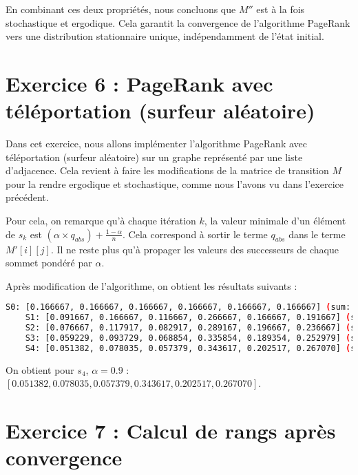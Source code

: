 En combinant ces deux propriétés, nous concluons que $M''$ est à la fois stochastique et ergodique. Cela garantit la convergence de l'algorithme PageRank vers une distribution stationnaire unique, indépendamment de l'état initial.

\section{Exercice 6 : PageRank avec téléportation (surfeur aléatoire)}

Dans cet exercice, nous allons implémenter l'algorithme PageRank avec téléportation (surfeur aléatoire) sur un graphe représenté par une liste d'adjacence. Cela revient à faire les modifications de la matrice de transition $M$ pour la rendre ergodique et stochastique, comme nous l'avons vu dans l'exercice précédent.

Pour cela, on remarque qu'à chaque itération $k$, la valeur minimale d'un élément de $s_k$ est $(\alpha \times q_{abs}) + \frac{1-\alpha}{n}$. Cela correspond à sortir le terme $q_{abs}$ dans le terme $M'[i][j]$. Il ne reste plus qu'à propager les valeurs des successeurs de chaque sommet pondéré par $\alpha$.

Après modification de l'algorithme, on obtient les résultats suivants :

\begin{minipage}{\dimexpr\linewidth-20pt}
    \begin{lstlisting}[language=bash, caption={Résultat de l'algorithme PageRank sur le graphe $G_2$ fourni, pour $k = 4$, avec la somme des valeurs du vecteur $s_k$ à chaque itération $k$, pour PageRank modifié avec téléportation et $\alpha = 0.9$.}]
    S0: [0.166667, 0.166667, 0.166667, 0.166667, 0.166667, 0.166667] (sum: 1.000000)
    S1: [0.091667, 0.166667, 0.116667, 0.266667, 0.166667, 0.191667] (sum: 1.000000)
    S2: [0.076667, 0.117917, 0.082917, 0.289167, 0.196667, 0.236667] (sum: 1.000000)
    S3: [0.059229, 0.093729, 0.068854, 0.335854, 0.189354, 0.252979] (sum: 1.000000)
    S4: [0.051382, 0.078035, 0.057379, 0.343617, 0.202517, 0.267070] (sum: 1.000000)
    \end{lstlisting}
\end{minipage}

On obtient pour $s_4$, $\alpha = 0.9$ : $[0.051382, 0.078035, 0.057379, 0.343617, 0.202517, 0.267070]$.

\section{Exercice 7 : Calcul de rangs après convergence}

